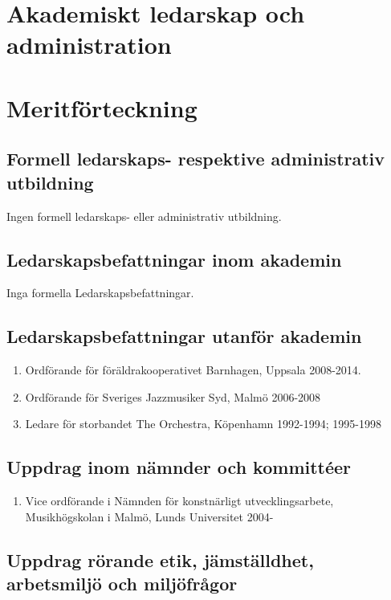 
\section*{\textsf{Akademiskt ledarskap och administration}}

\section*{\textsf{Meritförteckning}}



\subsection*{\textsf{Formell ledarskaps- respektive administrativ utbildning }}

Ingen formell ledarskaps- eller administrativ utbildning.
 
\subsection*{\textsf{Ledarskapsbefattningar inom akademin}}

Inga formella Ledarskapsbefattningar.

\subsection*{\textsf{Ledarskapsbefattningar utanför akademin}}

\begin{enumerate}
\item Ordförande för föräldrakooperativet Barnhagen, Uppsala 2008-2014.
\item Ordförande för Sveriges Jazzmusiker Syd, Malmö 2006-2008
\item Ledare för storbandet The Orchestra, Köpenhamn 1992-1994; 1995-1998 
\end{enumerate}

\subsection*{\textsf{Uppdrag inom nämnder och kommittéer}}

\begin{enumerate}
\item Vice ordförande i Nämnden för konstnärligt utvecklingsarbete, Musikhögskolan i Malmö, Lunds Universitet 2004-
\end{enumerate}

\subsection*{\textsf{Uppdrag rörande etik, jämställdhet, arbetsmiljö och miljöfrågor}}

